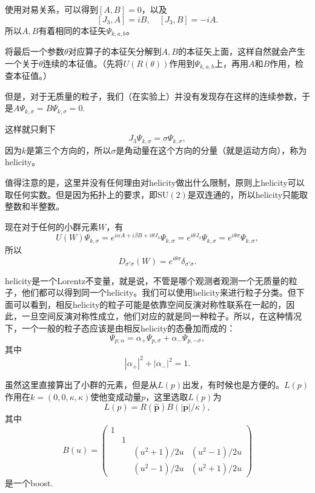 使用对易关系，可以得到$[A,B]=0$，以及
\[
[J_3,A]=iB,\quad [J_3,B]=-iA.
\]
所以$A,B$有着相同的本征矢$\Psi_{k,a,b}$。

将最后一个参数$\theta$对应算子的本征矢分解到$A,B$的本征矢上面，这样自然就会产生一个关于$\theta$连续的本征值。（先将$U(R(\theta))$作用到$\Psi_{k,a,b}$上，再用$A$和$B$作用，检查本征值。）

但是，对于无质量的粒子，我们（在实验上）并没有发现存在这样的连续参数，于是$A\Psi_{k,\sigma}=B\Psi_{k,\sigma}=0$.

这样就只剩下\[J_3\Psi_{k,\sigma}=\sigma\Psi_{k,\sigma},\]
因为$k$是第三个方向的，所以$\sigma$是角动量在这个方向的分量（就是运动方向），称为helicity。

值得注意的是，这里并没有任何理由对helicity做出什么限制，原则上helicity可以取任何实数。但是因为拓扑上的要求，即$\mathrm{SU}(2)$是双连通的，所以helicity只能取整数和半整数。

现在对于任何的小群元素$W$，有
\[
U(W)\Psi_{k,\sigma}=e^{i\alpha A+i\beta B+i\theta J_3}\Psi_{k,\sigma}=e^{i\theta J_3}\Psi_{k,\sigma}=e^{i\theta \sigma}\Psi_{k,\sigma},
\]
所以
\[
D_{\sigma'\sigma}(W)=e^{i\theta \sigma}\delta_{\sigma'\sigma}.
\]

helicity是一个Lorentz不变量，就是说，不管是哪个观测者观测一个无质量的粒子，他们都可以得到同一个helicity。我们可以使用helicity来进行粒子分类。但下面可以看到，相反helicity的粒子可能是依靠空间反演对称性联系在一起的，因此，一旦空间反演对称性成立，他们对应的就是同一种粒子。所以，在这种情况下，一个一般的粒子态应该是由相反helicity的态叠加而成的：
\[
\Psi_{p;\alpha}=\alpha_+\Psi_{p,\sigma}+\alpha_-\Psi_{p,-\sigma},
\]
其中
\[
|\alpha_+|^2+|\alpha_-|^2=1.
\]

虽然这里直接算出了小群的元素，但是从$L(p)$出发，有时候也是方便的。$L(p)$作用在$k=(0,0,\kappa,\kappa)$使他变成动量$p$，这里选取$L(p)$为
\[
	L(p)=R(\hat{\bm{p}})B(|\bm{p}|/\kappa),
\]
其中
\[
B(u)=\begin{pmatrix}
1&&&\\
&1&&\\
&&(u^2+1)/2u&(u^2-1)/2u\\
&&(u^2-1)/2u&(u^2+1)/2u
\end{pmatrix}
\]
是一个boost.

